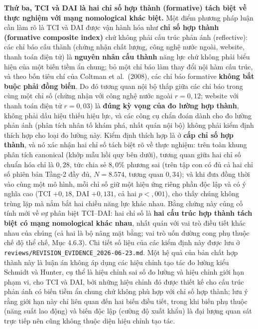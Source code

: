 \documentclass[
  a4paper,
  13pt]{extreport}
\begin{document}
\textbf{Thứ ba, TCI và DAI là hai chỉ số hợp thành (formative) tách biệt
về thực nghiệm với mạng nomological khác biệt.} Một điểm phương pháp
luận cần làm rõ là TCI và DAI được vận hành hóa như \textbf{chỉ số hợp
thành (formative composite index)} chứ không phải cấu trúc phản ánh
(reflective): các chỉ báo cấu thành (chứng nhận chất lượng, công nghệ
nước ngoài, website, thanh toán điện tử) là \textbf{nguyên nhân cấu
thành} năng lực chứ không phải biểu hiện của một biến tiềm ẩn chung; bỏ
một chỉ báo làm thay đổi nội hàm cấu trúc, và theo bốn tiêu chí của
Coltman et al.~(2008), các chỉ báo formative \textbf{không bắt buộc phải
đồng biến}. Do đó tương quan nội bộ thấp giữa các chỉ báo trong cùng một
chỉ số (chứng nhận với công nghệ nước ngoài \(r = 0{,}12\); website với
thanh toán điện tử \(r = 0{,}03\)) là \textbf{đúng kỳ vọng của đo lường
hợp thành}, không phải dấu hiệu thiếu hiệu lực, và các công cụ chẩn đoán
dành cho đo lường phản ánh (phân tích nhân tố khám phá, nhất quán nội
bộ) không phải kiểm định thích hợp cho loại đo lường này. Kiểm định
thích hợp là ở \textbf{cấp chỉ số hợp thành}, và nó xác nhận hai chỉ số
tách biệt rõ về thực nghiệm: trên toàn khung phân tích canonical (khớp
mẫu hồi quy bên dưới), tương quan giữa hai chỉ số chuẩn hóa chỉ là
\(0{,}28\), tức chia sẻ \(8{,}0\%\) phương sai (trên tập con có đủ cả
hai chỉ số phiên bản Tầng-2 đầy đủ, \(N = 8.574\), tương quan
\(0{,}34\)); và khi đưa đồng thời vào cùng một mô hình, mỗi chỉ số giữ
một hiệu ứng riêng phần độc lập và có ý nghĩa cao (TCI \(+0{,}18\), DAI
\(+0{,}131\), cả hai \(p < {,}001\)), cho thấy chúng không trùng lặp mà
nắm bắt hai chiều năng lực khác nhau. Bằng chứng này củng cố tính mới về
sự phân biệt TCI--DAI: hai chỉ số là \textbf{hai cấu trúc hợp thành tách
biệt có mạng nomological khác nhau}, nhất quán với vai trò điều tiết
khác nhau của chúng (cả hai là bộ nâng mặt bằng; vai trò uốn đường cong
phụ thuộc chế độ thể chế, Mục 4.6.3). Chi tiết số liệu của các kiểm định
này được lưu ở \texttt{reviews/REVISION\_EVIDENCE\_2026-06-23.md}. Một
hệ quả của bản chất hợp thành này là luận án không áp dụng các hiệu
chỉnh tạo tác đo lường kiểu Schmidt và Hunter, cụ thể là hiệu chỉnh sai
số đo lường và hiệu chỉnh giới hạn phạm vi, cho TCI và DAI, bởi những
hiệu chỉnh đó được thiết kế cho cấu trúc phản ánh có biến tiềm ẩn chung
chứ không phù hợp với chỉ số hợp thành; lưu ý rằng giới hạn này chỉ liên
quan đến hai biến điều tiết, trong khi biến phụ thuộc (năng suất lao
động) và biến độc lập (cường độ xuất khẩu) là đại lượng quan sát trực
tiếp nên cũng không thuộc diện hiệu chỉnh tạo tác.
\end{document}
